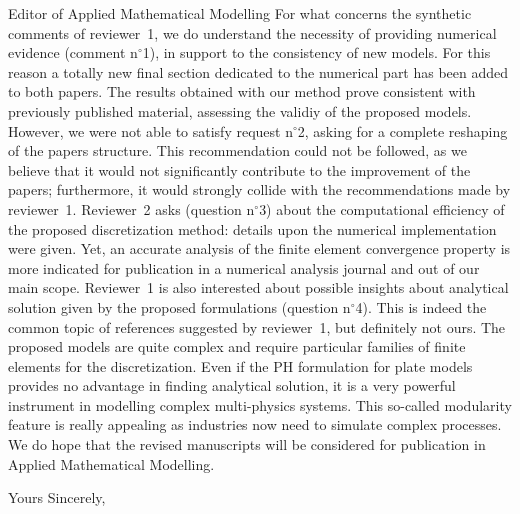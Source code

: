\documentclass[pdftex,a4paper,12pt,origdate]{letter}
\begin{document}
\begin{letter}{Editor of Applied Mathematical Modelling}
For what concerns the synthetic comments of reviewer~1, we do understand the necessity of providing numerical evidence (comment n$^\circ$1), in support to the consistency
of new models. For this reason a totally new final section dedicated to the numerical
part has been added to both papers. The results obtained with our method prove
consistent with previously published material, assessing the validiy of the proposed
models. However, we were not able to satisfy request n$^\circ$2, asking for a complete
reshaping of the papers structure. This recommendation could not be followed, as we
believe that it would not significantly contribute to the improvement of the papers;
furthermore, it would strongly collide with the recommendations made by reviewer~1.
Reviewer~2 asks (question n$^\circ$3) about the computational efficiency of the proposed
discretization method: details upon the numerical implementation were given. Yet,
an accurate analysis of the finite element convergence property is more indicated for
publication in a numerical analysis journal and out of our main scope. Reviewer~1 is
also interested about possible insights about analytical solution given by the proposed
formulations (question n$^\circ$4). This is indeed the common topic of references suggested
by reviewer~1, but definitely not ours. The proposed models are quite complex and
require particular families of finite elements for the discretization. Even if the PH formulation for plate models provides no advantage in finding analytical solution, it is a
very powerful instrument in modelling complex multi-physics systems. This so-called
modularity feature is really appealing as industries now need to simulate complex
processes. \\

We do hope that the revised manuscripts will be considered for publication in Applied
Mathematical Modelling.


\closing{Yours Sincerely,}


\end{letter}
\end{document}
